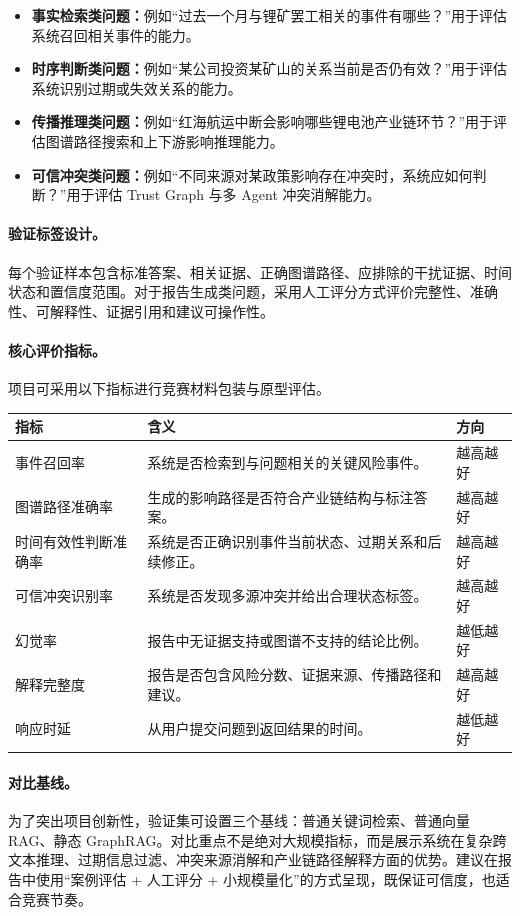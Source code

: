 \documentclass[12pt,a4paper]{article}
\newcommand{\term}[1]{\textbf{#1}}
\begin{document}
\begin{itemize}
\item \term{事实检索类问题：}例如“过去一个月与锂矿罢工相关的事件有哪些？”用于评估系统召回相关事件的能力。
\item \term{时序判断类问题：}例如“某公司投资某矿山的关系当前是否仍有效？”用于评估系统识别过期或失效关系的能力。
\item \term{传播推理类问题：}例如“红海航运中断会影响哪些锂电池产业链环节？”用于评估图谱路径搜索和上下游影响推理能力。
\item \term{可信冲突类问题：}例如“不同来源对某政策影响存在冲突时，系统应如何判断？”用于评估 Trust Graph 与多 Agent 冲突消解能力。
\end{itemize}

\paragraph{验证标签设计。}每个验证样本包含标准答案、相关证据、正确图谱路径、应排除的干扰证据、时间状态和置信度范围。对于报告生成类问题，采用人工评分方式评价完整性、准确性、可解释性、证据引用和建议可操作性。

\paragraph{核心评价指标。}项目可采用以下指标进行竞赛材料包装与原型评估。
\begin{longtable}{p{}p{}p{}}
\toprule
\textbf{指标} & \textbf{含义} & \textbf{方向} \\
\midrule
事件召回率 & 系统是否检索到与问题相关的关键风险事件。 & 越高越好 \\
图谱路径准确率 & 生成的影响路径是否符合产业链结构与标注答案。 & 越高越好 \\
时间有效性判断准确率 & 系统是否正确识别事件当前状态、过期关系和后续修正。 & 越高越好 \\
可信冲突识别率 & 系统是否发现多源冲突并给出合理状态标签。 & 越高越好 \\
幻觉率 & 报告中无证据支持或图谱不支持的结论比例。 & 越低越好 \\
解释完整度 & 报告是否包含风险分数、证据来源、传播路径和建议。 & 越高越好 \\
响应时延 & 从用户提交问题到返回结果的时间。 & 越低越好 \\
\bottomrule
\end{longtable}

\paragraph{对比基线。}为了突出项目创新性，验证集可设置三个基线：普通关键词检索、普通向量 RAG、静态 GraphRAG。对比重点不是绝对大规模指标，而是展示系统在复杂跨文本推理、过期信息过滤、冲突来源消解和产业链路径解释方面的优势。建议在报告中使用“案例评估 + 人工评分 + 小规模量化”的方式呈现，既保证可信度，也适合竞赛节奏。
\end{document}
